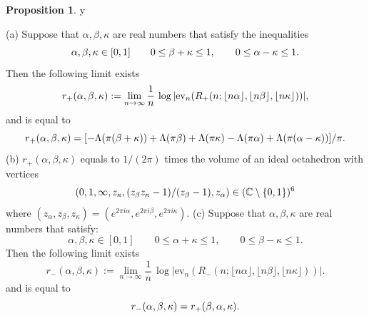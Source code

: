 \documentclass{amsart}
\theoremstyle{definition}
\newtheorem{proposition}[theorem]{Proposition}
\def\printname#1{
    \if\draft y
        \smash{\makebox[0pt]{\hspace{-0.5in}
            \raisebox{8pt}{\tt\tiny #1}}}
    \fi
}
\def\lbl#1{\label{#1}\printname{#1}}
\def\BC{\mathbb C}
\def\a{\alpha}
\def\La{\Lambda}
\def\b{\beta}
\def\k{\kappa}
\def\ev{\mathrm{ev}}
\begin{document}
\begin{proposition}
\lbl{prop.R+limit}
{\rm (a)}
Suppose that $\a,\b,\k$ are real numbers that satisfy the inequalities
\begin{equation}
\lbl{eq.abk}
\a,\b,\k \in [0,1] \qquad
0 \leq \b+\k \leq 1, \qquad 0 \leq \a-\k \leq 1.
\end{equation}
Then the following limit exists
\begin{equation}
\lbl{eq.r+}
r_+(\a,\b,\k) :=
\lim_{n\to \infty}
\frac{1}{n} \, \log |\ev_n(R_+(n; \lfloor n\a \rfloor,
\lfloor n\b \rfloor,\lfloor n\k \rfloor ))|,
\end{equation}
and is equal to
\begin{equation}
\lbl{eq.r+equal}
r_+(\a,\b,\k)= [-\La(\pi(\b+\k)) +
\La(\pi\b)+\La(\pi\k)-\La(\pi\a)+\La(\pi(\a-\k))]/\pi.
\end{equation}
{\rm (b)} $r_+(\a,\b,\k)$ equals to $1/(2\pi)$ times the volume
of an ideal octahedron with vertices
\begin{equation}
\lbl{eq.vert8}
(0,1,\infty,z_{\kappa},(z_{\b}z_{\kappa}-1)/(z_{\b}-1),z_{\a}) \in
(\BC\setminus\{0,1\})^6
\end{equation}
where
$(z_{\a},z_{\b},z_{\kappa})=(e^{2 \pi i \a},e^{2 \pi i \b}, e^{2 \pi i \kappa})$.
\newline
{\rm (c)} Suppose that $\a,\b,\k$ are real numbers that satisfy:
\begin{equation*}
 \a,\b,\k \in [0,1] \qquad 0 \leq \a+\k \leq 1, \qquad 0
\leq \b-\k \leq 1.
\end{equation*}
Then the following limit exists
$$
r_-(\a,\b,\k) := \lim_{n\to \infty}
\frac{1}{n}\, \log |\ev_n(R_-(n; \lfloor n\a \rfloor,
\lfloor n\b \rfloor,\lfloor n\k \rfloor ))|.
$$
and is equal to
\begin{equation}
\lbl{62}
r_-(\a,\b,\k) = r_+(\b,\a,\k).%
\end{equation}
\end{proposition}
\end{document}
